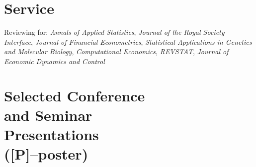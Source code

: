 \documentclass[margin,line]{resume}
\begin{document}
\begin{resume}
\vspace{-5mm}     

\section{\mysidestyle Service}
Reviewing for: \textit{Annals of Applied Statistics}, \textit{Journal of the Royal Society Interface}, \textit{Journal of Financial Econometrics}, \textit{Statistical Applications in Genetics and Molecular Biology},  \textit{Computational Economics}, \textit{REVSTAT}, \textit{Journal of Economic Dynamics and Control}


\vspace{-1mm}

\section{\mysidestyle Selected Conference \\and Seminar \\Presentations \\ ([P]--poster)} 


\end{resume}
\end{document}
